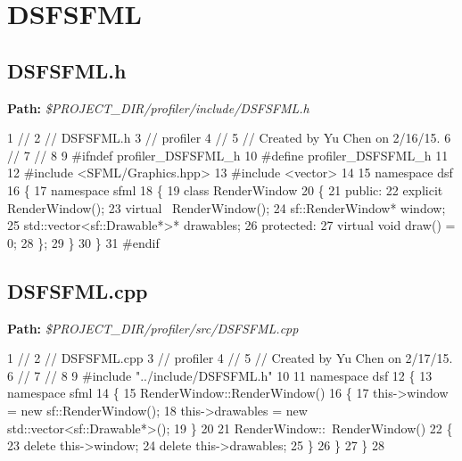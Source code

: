  \hypertarget{_benchmark_program_BenchmarkProgramDSFSFML}{}\section{D\+S\+F\+S\+F\+M\+L}\label{_benchmark_program_BenchmarkProgramDSFSFML}
\hypertarget{_benchmark_program_BenchmarkProgramDSFSFML_h}{}\subsection{D\+S\+F\+S\+F\+M\+L.\+h}\label{_benchmark_program_BenchmarkProgramDSFSFML_h}
{\bfseries Path\+:} {\itshape \$\+P\+R\+O\+J\+E\+C\+T\+\_\+\+D\+I\+R/profiler/include/\+D\+S\+F\+S\+F\+M\+L.h} 
\begin{DoxyCodeInclude}
1 \textcolor{comment}{//}
2 \textcolor{comment}{//  DSFSFML.h}
3 \textcolor{comment}{//  profiler}
4 \textcolor{comment}{//}
5 \textcolor{comment}{//  Created by Yu Chen on 2/16/15.}
6 \textcolor{comment}{//}
7 \textcolor{comment}{//}
8 
9 \textcolor{preprocessor}{#ifndef profiler\_DSFSFML\_h}
10 \textcolor{preprocessor}{#define profiler\_DSFSFML\_h}
11 
12 \textcolor{preprocessor}{#include <SFML/Graphics.hpp>}
13 \textcolor{preprocessor}{#include <vector>}
14 
15 \textcolor{keyword}{namespace }dsf
16 \{
17     \textcolor{keyword}{namespace }sfml
18     \{
19         \textcolor{keyword}{class }RenderWindow
20         \{
21         \textcolor{keyword}{public}:
22             \textcolor{keyword}{explicit} RenderWindow();
23             \textcolor{keyword}{virtual} ~RenderWindow();
24             sf::RenderWindow* window;
25             std::vector<sf::Drawable*>* drawables;
26         \textcolor{keyword}{protected}:
27             \textcolor{keyword}{virtual} \textcolor{keywordtype}{void} draw() = 0;
28         \};
29     \}
30 \}
31 \textcolor{preprocessor}{#endif}
\end{DoxyCodeInclude}
 \hypertarget{_benchmark_program_BenchmarkProgramDSFSFML_cpp}{}\subsection{D\+S\+F\+S\+F\+M\+L.\+cpp}\label{_benchmark_program_BenchmarkProgramDSFSFML_cpp}
{\bfseries Path\+:} {\itshape \$\+P\+R\+O\+J\+E\+C\+T\+\_\+\+D\+I\+R/profiler/src/\+D\+S\+F\+S\+F\+M\+L.cpp} 
\begin{DoxyCodeInclude}
1 \textcolor{comment}{//}
2 \textcolor{comment}{//  DSFSFML.cpp}
3 \textcolor{comment}{//  profiler}
4 \textcolor{comment}{//}
5 \textcolor{comment}{//  Created by Yu Chen on 2/17/15.}
6 \textcolor{comment}{//}
7 \textcolor{comment}{//}
8 
9 \textcolor{preprocessor}{#include "../include/DSFSFML.h"}
10 
11 \textcolor{keyword}{namespace }dsf
12 \{
13     \textcolor{keyword}{namespace }sfml
14     \{
15         RenderWindow::RenderWindow()
16         \{
17             this->window = \textcolor{keyword}{new} sf::RenderWindow();
18             this->drawables = \textcolor{keyword}{new} std::vector<sf::Drawable*>();
19         \}
20 
21         RenderWindow::~RenderWindow()
22         \{
23             \textcolor{keyword}{delete} this->window;
24             \textcolor{keyword}{delete} this->drawables;
25         \}
26     \}
27 \}
28 
\end{DoxyCodeInclude}
